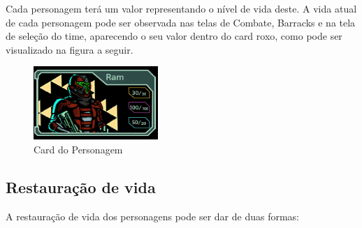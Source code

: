 \documentclass[11pt]{article} %
\begin{document}
Cada personagem terá um valor representando o nível de vida deste. A vida atual de cada personagem pode ser observada nas telas de Combate, Barracks e na tela de seleção do time, aparecendo o seu valor dentro do card roxo, como pode ser visualizado na figura a seguir.

\newpage

\begin{figure}[!htp]
\centering
\includegraphics[scale=0.75]{res/card.png}
\caption{Card do Personagem}
\label{Card do Personagem}
\end{figure}

\subsection{Restauração de vida}

A restauração de vida dos personagens pode ser dar de duas formas:
\end{document}
